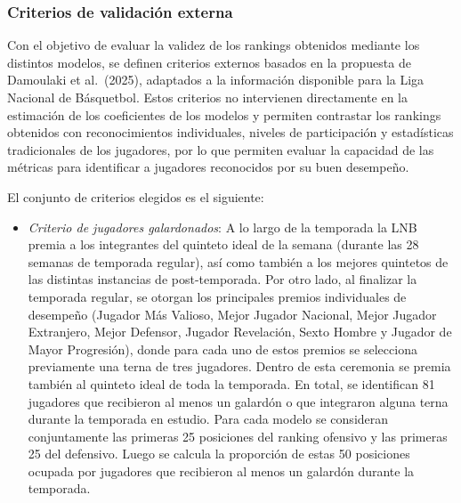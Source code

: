 \documentclass[
  12pt,
]{article}
\providecommand{\tightlist}{%
  \setlength{\itemsep}{0pt}\setlength{\parskip}{0pt}}
\begin{document}
\subsubsection{Criterios de validación
externa}\label{criterios-de-validaciuxf3n-externa}

Con el objetivo de evaluar la validez de los rankings obtenidos mediante
los distintos modelos, se definen criterios externos basados en la
propuesta de Damoulaki et al.~(2025), adaptados a la información
disponible para la Liga Nacional de Básquetbol. Estos criterios no
intervienen directamente en la estimación de los coeficientes de los
modelos y permiten contrastar los rankings obtenidos con reconocimientos
individuales, niveles de participación y estadísticas tradicionales de
los jugadores, por lo que permiten evaluar la capacidad de las métricas
para identificar a jugadores reconocidos por su buen desempeño.

El conjunto de criterios elegidos es el siguiente:

\begin{itemize}
\tightlist
\item
  \emph{Criterio de jugadores galardonados}: A lo largo de la temporada
  la LNB premia a los integrantes del quinteto ideal de la semana
  (durante las 28 semanas de temporada regular), así como también a los
  mejores quintetos de las distintas instancias de post-temporada. Por
  otro lado, al finalizar la temporada regular, se otorgan los
  principales premios individuales de desempeño (Jugador Más Valioso,
  Mejor Jugador Nacional, Mejor Jugador Extranjero, Mejor Defensor,
  Jugador Revelación, Sexto Hombre y Jugador de Mayor Progresión), donde
  para cada uno de estos premios se selecciona previamente una terna de
  tres jugadores. Dentro de esta ceremonia se premia también al quinteto
  ideal de toda la temporada. En total, se identifican 81 jugadores que
  recibieron al menos un galardón o que integraron alguna terna durante
  la temporada en estudio. Para cada modelo se consideran conjuntamente
  las primeras 25 posiciones del ranking ofensivo y las primeras 25 del
  defensivo. Luego se calcula la proporción de estas 50 posiciones
  ocupada por jugadores que recibieron al menos un galardón durante la
  temporada.
\end{itemize}
\end{document}
